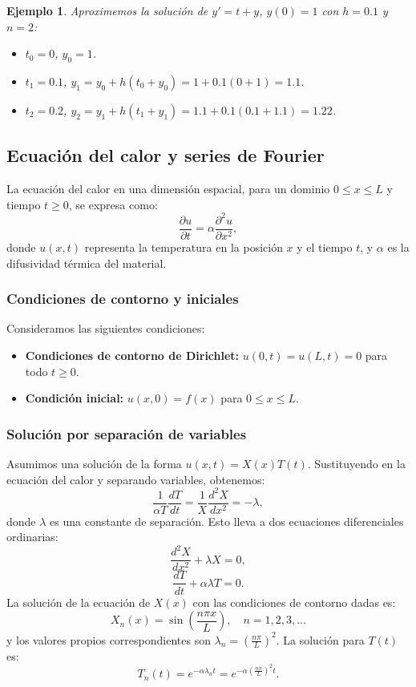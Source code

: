 \documentclass[12pt, a4paper]{article}
\theoremstyle{rioplatense}
\newtheorem{ejemplo}{Ejemplo}[section]
\begin{document}
\begin{ejemplo}
    Aproximemos la solución de $y' = t + y$, $y(0) = 1$ con $h = 0.1$ y $n = 2$:
    \begin{itemize}
        \item $t_0 = 0$, $y_0 = 1$.
        \item $t_1 = 0.1$, $y_1 = y_0 + h (t_0 + y_0) = 1 + 0.1 (0 + 1) = 1.1$.
        \item $t_2 = 0.2$, $y_2 = y_1 + h (t_1 + y_1) = 1.1 + 0.1 (0.1 + 1.1) = 1.22$.
    \end{itemize}
\end{ejemplo}


\subsection{Ecuación del calor y series de Fourier}
La ecuación del calor en una dimensión espacial, para un dominio $0 \leq x \leq L$ y tiempo $t \geq 0$, se expresa como:
\[
\frac{\partial u}{\partial t} = \alpha \frac{\partial^2 u}{\partial x^2},
\]
donde $u(x,t)$ representa la temperatura en la posición $x$ y el tiempo $t$, y $\alpha$ es la difusividad térmica del material.

\subsubsection{Condiciones de contorno y iniciales}
Consideramos las siguientes condiciones:
\begin{itemize}
    \item \textbf{Condiciones de contorno de Dirichlet:} $u(0,t) = u(L,t) = 0$ para todo $t \geq 0$.
    \item \textbf{Condición inicial:} $u(x,0) = f(x)$ para $0 \leq x \leq L$.
\end{itemize}

\subsubsection{Solución por separación de variables}
Asumimos una solución de la forma $u(x,t) = X(x)T(t)$. Sustituyendo en la ecuación del calor y separando variables, obtenemos:
\[
\frac{1}{\alpha T} \frac{dT}{dt} = \frac{1}{X} \frac{d^2X}{dx^2} = -\lambda,
\]
donde $\lambda$ es una constante de separación. Esto lleva a dos ecuaciones diferenciales ordinarias:
\[
\frac{d^2X}{dx^2} + \lambda X = 0,
\]
\[
\frac{dT}{dt} + \alpha \lambda T = 0.
\]
La solución de la ecuación de $X(x)$ con las condiciones de contorno dadas es:
\[
X_n(x) = \sin\left(\frac{n\pi x}{L}\right), \quad n = 1, 2, 3, \dots
\]
y los valores propios correspondientes son $\lambda_n = \left(\frac{n\pi}{L}\right)^2$.
La solución para $T(t)$ es:
\[
T_n(t) = e^{-\alpha \lambda_n t} = e^{-\alpha \left(\frac{n\pi}{L}\right)^2 t}.
\]
\end{document}
